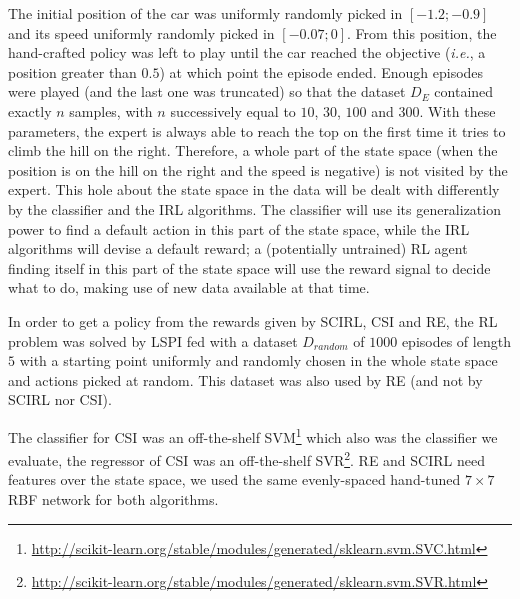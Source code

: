 \documentclass[smallextended]{svjour3}
\begin{document}
The initial position of the car was uniformly randomly picked in $[-1.2;-0.9]$ and its speed uniformly randomly picked in $[-0.07;0]$. From this position, the hand-crafted policy was left to play until the car reached the objective ({\it i.e.}, a position greater than $0.5$) at which point the episode ended. Enough episodes were played (and the last one was truncated) so that the dataset $D_E$ contained exactly $n$ samples, with $n$ successively equal to $10$, $30$, $100$ and $300$. With these parameters, the expert is always able to reach the top on the first time it tries to climb the hill on the right. Therefore, a whole part of the state space (when the position is on the hill on the right and the speed is negative) is not visited by the expert. This hole about the state space in the data will be dealt with differently by the classifier and the IRL algorithms. The classifier will use its generalization power to find a default action in this part of the state space, while the IRL algorithms will devise a default reward; a (potentially untrained) RL agent finding itself in this part of the state space will use the reward signal to decide what to do, making use of new data available at that time.

In order to get a policy from the rewards given by SCIRL, CSI and RE, the RL problem was solved by LSPI fed with a dataset $D_{random}$ of $1000$ episodes of length $5$ with a starting point uniformly and randomly chosen in the whole state space and actions picked at random. This dataset was also used by RE (and not by SCIRL nor CSI).

The classifier for CSI was an off-the-shelf SVM\footnote{\url{http://scikit-learn.org/stable/modules/generated/sklearn.svm.SVC.html}} which also was the classifier we evaluate, the regressor of CSI was an off-the-shelf SVR\footnote{\url{http://scikit-learn.org/stable/modules/generated/sklearn.svm.SVR.html}}. RE and SCIRL need features over the state space, we used the same evenly-spaced hand-tuned $7\times 7$ RBF network for both algorithms.
\end{document}
